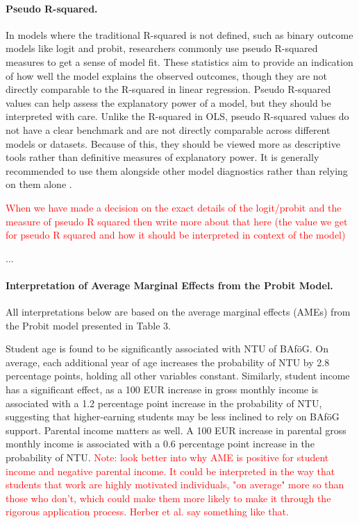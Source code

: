 \paragraph{Pseudo R-squared.} In models where the traditional R-squared is not defined, such as binary outcome models like logit and probit, researchers commonly use pseudo R-squared measures to get a sense of model fit. These statistics aim to provide an indication of how well the model explains the observed outcomes, though they are not directly comparable to the R-squared in linear regression. Pseudo R-squared values can help assess the explanatory power of a model, but they should be interpreted with care. Unlike the R-squared in OLS, pseudo R-squared values do not have a clear benchmark and are not directly comparable across different models or datasets. Because of this, they should be viewed more as descriptive tools rather than definitive measures of explanatory power. It is generally recommended to use them alongside other model diagnostics rather than relying on them alone \citep{ozili_acceptable_2023}.

\textcolor{red}{When we have made a decision on the exact details of the logit/probit and the measure of pseudo R squared then write more about that here (the value we get for pseudo R squared and how it should be interpreted in context of the model)}





...

\paragraph{Interpretation of Average Marginal Effects from the Probit Model.} All interpretations below are based on the average marginal effects (AMEs) from the Probit model presented in Table 3.

Student age is found to be significantly associated with NTU of BAföG. On average, each additional year of age increases the probability of NTU by 2.8 percentage points, holding all other variables constant. Similarly, student income has a significant effect, as a 100 EUR increase in gross monthly income is associated with a 1.2 percentage point increase in the probability of NTU, suggesting that higher-earning students may be less inclined to rely on BAföG support. Parental income matters as well. A 100 EUR increase in parental gross monthly income is associated with a 0.6 percentage point increase in the probability of NTU. \textcolor{red}{Note: look better into why AME is positive for student income and negative parental income. It could be interpreted in the way that students that work are highly motivated individuals, "on average" more so than those who don't, which could make them more likely to make it through the rigorous application process. Herber et al. say something like that.}

